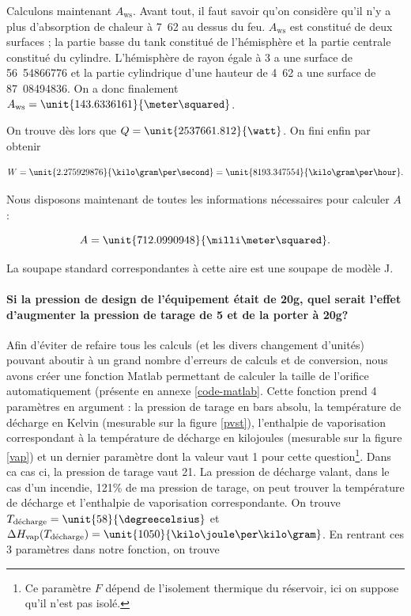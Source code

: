 Calculons maintenant $A_{\text{ws}}$. Avant tout, il faut
savoir qu'on considère qu'il n'y a plus d'absorption de chaleur
à \unit{7.62}{\meter} au dessus du feu\cite{mignon}.
$A_{\text{ws}}$ est constitué de deux surfaces ; la partie
basse du tank constitué de l'hémisphère et la partie centrale
constitué du cylindre. L'hémisphère de rayon égale à \unit{3}{\meter}
a une surface de \unit{56.54866776}{\meter\squared} et la partie
cylindrique d'une hauteur de \unit{4.62}{\meter} a une surface
de \unit{87.08494836}{\meter\squared}. On a donc finalement 
$A_{\text{ws}} = \unit{143.6336161}{\meter\squared}$.

On trouve dès lors que $Q = \unit{2537661.812}{\watt}$.
On fini enfin par obtenir 

$$W = \unit{2.275929876}{\kilo\gram\per\second} =
\unit{8193.347554}{\kilo\gram\per\hour}.$$

Nous disposons maintenant de toutes les informations nécessaires
pour calculer $A$ :

$$A = \unit{712.0990948}{\milli\meter\squared}.$$

La soupape standard correspondantes à cette aire est une soupape
de modèle J\cite{mignon}.

\paragraph{Si la pression de design de l'équipement était de \unit{20}{\bbar g},
quel serait l'effet d'augmenter la pression de tarage de \unit{5}{\bbar} et de 
la porter à \unit{20}{\bbar g}?}
Afin d'éviter de refaire tous les calculs (et les divers changement d'unités)
pouvant aboutir à un grand nombre d'erreurs de calculs et de conversion, nous
avons créer une fonction Matlab permettant de calculer la taille de l'orifice
automatiquement (présente en annexe \ref{code-matlab}. Cette fonction prend 4 paramètres en argument : la pression
de tarage en bars absolu, la température de décharge en Kelvin (mesurable sur
la figure \ref{pvst}), l'enthalpie de vaporisation correspondant
à la température de décharge en kilojoules (mesurable sur la figure \ref{vap}) et un dernier
paramètre dont la valeur vaut 1 pour cette question\footnote{Ce paramètre $F$ dépend
de l'isolement thermique du réservoir, ici on suppose qu'il n'est pas isolé.}.
Dans ca cas ci, la pression de tarage vaut \unit{21}{\bbar}. La pression
de décharge valant, dans le cas d'un incendie, 121\% de ma pression de tarage,
on peut trouver la température de décharge et l'enthalpie de vaporisation
correspondante. On trouve $T_{\text{décharge}} = \unit{58}{\degreecelsius}$
et $\Delta H_{\text{vap}}(T_{\text{décharge}}) = \unit{1050}{\kilo\joule\per\kilo\gram}$.
En rentrant ces 3 paramètres dans notre fonction, on trouve 


